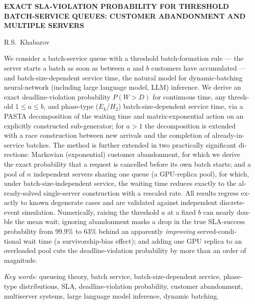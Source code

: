 \documentclass[12pt,a4paper]{article}
\begin{document}
\bigskip
\begin{center}
\begin{minipage}{0.9\linewidth}
\centering
{\bfseries EXACT SLA-VIOLATION PROBABILITY FOR THRESHOLD BATCH-SERVICE QUEUES: CUSTOMER ABANDONMENT AND MULTIPLE SERVERS}
\end{minipage}
\end{center}

\begin{center}
\small R.S.~Khabarov
\end{center}

\begin{otherlanguage}{english}
\small
We consider a batch-service queue with a threshold batch-formation rule --- the server starts a batch as soon as between $a$ and $b$ customers have accumulated --- and batch-size-dependent service time, the natural model for dynamic-batching neural-network (including large language model, LLM) inference. We derive an exact deadline-violation probability $P(W>D)$ for continuous time, any threshold $1\le a\le b$, and phase-type ($E_k$/$H_2$) batch-size-dependent service time, via a PASTA decomposition of the waiting time and matrix-exponential action on an explicitly constructed sub-generator; for $a>1$ the decomposition is extended with a race construction between new arrivals and the completion of already-in-service batches. The method is further extended in two practically significant directions: Markovian (exponential) customer abandonment, for which we derive the exact probability that a request is cancelled before its own batch starts; and a pool of $n$ independent servers sharing one queue (a GPU-replica pool), for which, under batch-size-independent service, the waiting time reduces exactly to the already-solved single-server construction with a rescaled rate. All results regress exactly to known degenerate cases and are validated against independent discrete-event simulation. Numerically, raising the threshold $a$ at a fixed $b$ can nearly double the mean wait; ignoring abandonment masks a drop in the true SLA-success probability from 99.9\% to 63\% behind an apparently \emph{improving} served-conditional wait time (a survivorship-bias effect); and adding one GPU replica to an overloaded pool cuts the deadline-violation probability by more than an order of magnitude.

\medskip
\noindent\textit{Key words:} queueing theory, batch service, batch-size-dependent service, phase-type distributions, SLA, deadline-violation probability, customer abandonment, multiserver systems, large language model inference, dynamic batching.
\end{otherlanguage}
\normalsize
\end{document}
